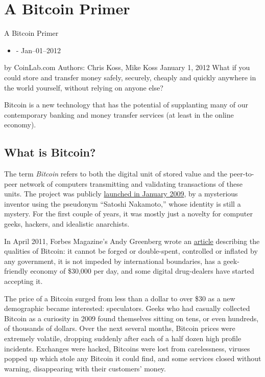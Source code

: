 \documentclass[12pt,twocolumn]{article}
\begin{document}
\section{A Bitcoin Primer}

A Bitcoin Primer
\begin{itemize}
\item
   -
  Jan--01--2012
\end{itemize}
 by CoinLab.com Authors: Chris Koss, Mike Koss January 1, 2012
What if you could store and transfer money safely, securely, cheaply and
quickly anywhere in the world yourself, without relying on anyone else?

Bitcoin is a new technology that has the potential of supplanting many
of our contemporary banking and money transfer services (at least in the
online economy).

\subsection{What is Bitcoin?}

The term \emph{Bitcoin} refers to both the digital unit of stored value
and the peer-to-peer network of computers transmitting and validating
transactions of these units. The project was publicly
\href{http://bitcoin.org/bitcoin.pdf}{launched in January 2009}, by a
mysterious inventor using the pseudonym ``Satoshi Nakamoto,'' whose
identity is still a mystery. For the first couple of years, it was
mostly just a novelty for computer geeks, hackers, and idealistic
anarchists.

In April 2011, Forbes Magazine's Andy Greenberg wrote an
\href{http://www.forbes.com/forbes/2011/0509/technology-psilocybin-bitcoins-gavin-andresen-crypto-currency.html}{article}
describing the qualities of Bitcoin: it cannot be forged or
double-spent, controlled or inflated by any government, it is not
impeded by international boundaries, has a geek-friendly economy of
\$30,000 per day, and some digital drug-dealers have started accepting
it.

The price of a Bitcoin surged from less than a dollar to over \$30 as a
new demographic became interested: speculators. Geeks who had casually
collected Bitcoin as a curiosity in 2009 found themselves sitting on
tens, or even hundreds, of thousands of dollars. Over the next several
months, Bitcoin prices were extremely volatile, dropping suddenly after
each of a half dozen high profile incidents. Exchanges were hacked,
Bitcoins were lost from carelessness, viruses popped up which stole any
Bitcoin it could find, and some services closed without warning,
disappearing with their customers' money.
\end{document}
